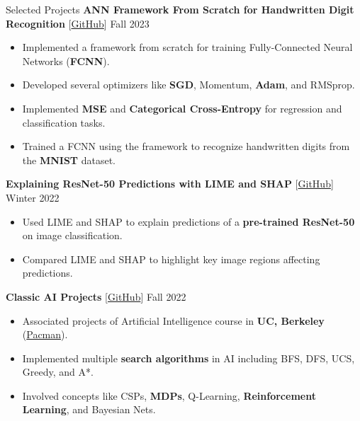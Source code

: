 \documentclass{resume}
\begin{document}
\begin{rSection}{Selected Projects}
    {\bf ANN Framework From Scratch for Handwritten Digit Recognition} [\href{https://github.com/SepehrNoey/Neural-Networks-Framework-from-Scratch}{GitHub}] \hspace{3em} {Fall 2023}
    \vspace{-1.6em}
    \begin{itemize}[topsep=0pt, leftmargin=1em, label=$\circ$]
        \item Implemented a framework from scratch for training Fully-Connected Neural Networks ({\bf FCNN}).
        \item Developed several optimizers like {\bf SGD}, Momentum, {\bf Adam}, and RMSprop.
        \item Implemented {\bf MSE} and {\bf Categorical Cross-Entropy} for regression and classification tasks.
        \item Trained a FCNN using the framework to recognize handwritten digits from the {\bf MNIST} dataset.
    \end{itemize}

    {\bf Explaining ResNet-50 Predictions with LIME and SHAP} [\href{https://github.com/SepehrNoey/Explaining-ResNet50-Predictions-with-LIME-and-SHAP}{GitHub}] \hspace{6em} {Winter 2022}
    \vspace{-1.6em}
    \begin{itemize}[topsep=0pt, leftmargin=1em, label=$\circ$]
        \item Used LIME and SHAP to explain predictions of a {\bf pre-trained ResNet-50} on image classification.
        \item Compared LIME and SHAP to highlight key image regions affecting predictions.
    \end{itemize}

    {\bf Classic AI Projects} [\href{https://github.com/SepehrNoey/Artificial-Intelligence-Course-Projects}{GitHub}] \hspace{24em} {Fall 2022}
    \vspace{-1.6em}
    \begin{itemize}[topsep=0pt, leftmargin=1em, label=$\circ$]
        \item Associated projects of Artificial Intelligence course in {\bf UC, Berkeley} (\href{https://ai.berkeley.edu/project_overview.html}{Pacman}).
        \item Implemented multiple {\bf search algorithms} in AI including BFS, DFS, UCS, Greedy, and A*.
        \item Involved concepts like CSPs, {\bf MDPs}, Q-Learning, {\bf Reinforcement Learning}, and Bayesian Nets.
    \end{itemize}
\end{rSection}
\end{document}
